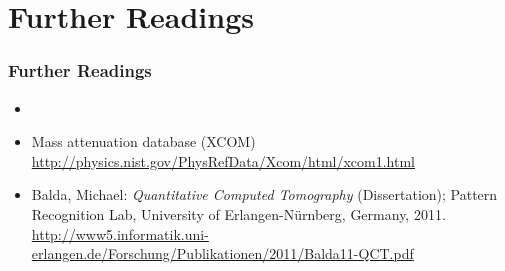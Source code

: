 \section{Further Readings}

\begin{frame}
    \frametitle{Further Readings}
    \begin{itemize}
        \setlength\itemsep{0.4cm}

        \item {}

        \item Mass attenuation database (XCOM) \\
              {\large{\url{http://physics.nist.gov/PhysRefData/Xcom/html/xcom1.html}}}
        \item Balda, Michael: \textit{Quantitative Computed Tomography} (Dissertation); Pattern Recognition Lab, University of Erlangen-Nürnberg, Germany, 2011. \\
              {\large{\url{http://www5.informatik.uni-erlangen.de/Forschung/Publikationen/2011/Balda11-QCT.pdf}}}


    \end{itemize}
\end{frame}





